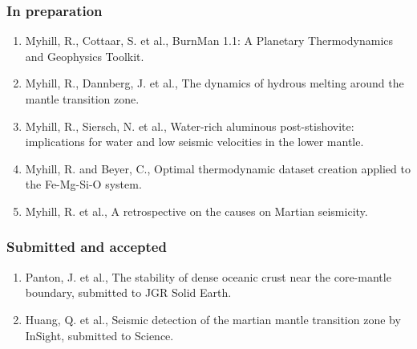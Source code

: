 \documentclass[11pt,twoside,a4paper]{article}
\begin{document}
\subsubsection*{In preparation}
\small \sloppy
\begin{enumerate}
\item Myhill, R., Cottaar, S. et al., BurnMan 1.1: A Planetary Thermodynamics and Geophysics Toolkit.
\item Myhill, R., Dannberg, J. et al., The dynamics of hydrous melting around the mantle transition zone.
\item Myhill, R., Siersch, N. et al., Water-rich aluminous post-stishovite: implications for water and low seismic velocities in the lower mantle.
\item Myhill, R. and Beyer, C., Optimal thermodynamic dataset creation applied to the Fe-Mg-Si-O system.
\item Myhill, R. et al., A retrospective on the causes on Martian seismicity.
\end{enumerate}

\subsubsection*{Submitted and accepted}
\begin{enumerate}
  \item Panton, J. et al., The stability of dense oceanic crust near the core-mantle boundary, submitted to JGR Solid Earth.
  \item Huang, Q. et al., Seismic detection of the martian mantle transition zone by InSight, submitted to Science.
\end{enumerate}
\end{document}
